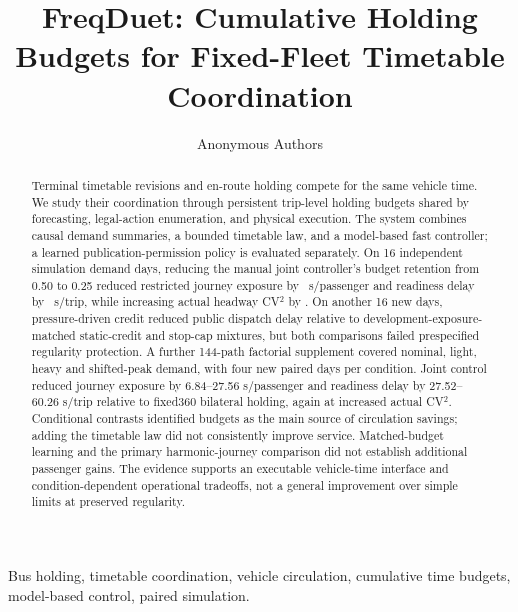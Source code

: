 \documentclass[letterpaper,journal]{IEEEtran}
\begin{document}
\title{FreqDuet: Cumulative Holding Budgets for Fixed-Fleet Timetable Coordination}
\author{Anonymous Authors}
\maketitle
\begin{abstract}
Terminal timetable revisions and en-route holding compete for the same vehicle time. We study their coordination through persistent trip-level holding budgets shared by forecasting, legal-action enumeration, and physical execution. The system combines causal demand summaries, a bounded timetable law, and a model-based fast controller; a learned publication-permission policy is evaluated separately. On 16 independent simulation demand days, reducing the manual joint controller's budget retention from 0.50 to 0.25 reduced restricted journey exposure by \ManualBudgetGain\ s/passenger and readiness delay by \ManualReadinessGain\ s/trip, while increasing actual headway CV$^2$ by \ManualBudgetCV. On another 16 new days, pressure-driven credit reduced public dispatch delay relative to development-exposure-matched static-credit and stop-cap mixtures, but both comparisons failed prespecified regularity protection. A further 144-path factorial supplement covered nominal, light, heavy and shifted-peak demand, with four new paired days per condition. Joint control reduced journey exposure by 6.84--27.56 s/passenger and readiness delay by 27.52--60.26 s/trip relative to fixed360 bilateral holding, again at increased actual CV$^2$. Conditional contrasts identified budgets as the main source of circulation savings; adding the timetable law did not consistently improve service. Matched-budget learning and the primary harmonic-journey comparison did not establish additional passenger gains. The evidence supports an executable vehicle-time interface and condition-dependent operational tradeoffs, not a general improvement over simple limits at preserved regularity.
\end{abstract}
\begin{IEEEkeywords}
Bus holding, timetable coordination, vehicle circulation, cumulative time budgets, model-based control, paired simulation.
\end{IEEEkeywords}






\end{document}
